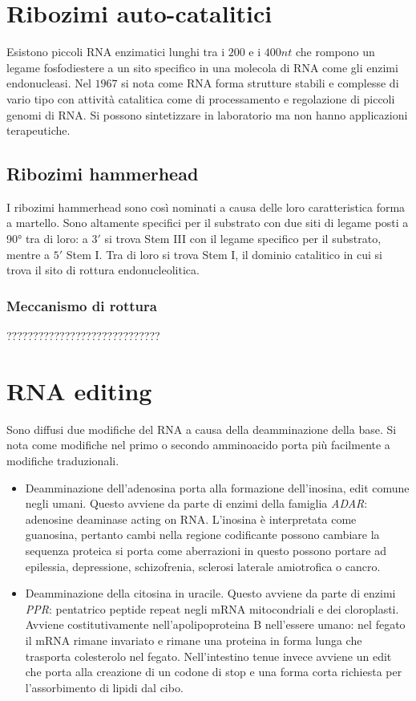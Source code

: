 \section{Ribozimi auto-catalitici}
Esistono piccoli RNA enzimatici lunghi tra i $200$ e i $400nt$ che rompono un legame fosfodiestere a un sito specifico in una molecola di RNA come gli enzimi endonucleasi. Nel $1967$
si nota come RNA forma strutture stabili e complesse di vario tipo con attivit\`a catalitica come di processamento e regolazione di piccoli genomi di RNA. Si possono sintetizzare in 
laboratorio ma non hanno applicazioni terapeutiche. 
\subsection{Ribozimi hammerhead}
I ribozimi hammerhead sono cos\`i nominati a causa delle loro caratteristica forma a martello. Sono altamente specifici per il substrato con due siti di legame posti a \ang{90} 
tra di loro: a $3'$ si trova Stem III con il legame specifico per il substrato, mentre a $5'$ Stem I. Tra di loro si trova Stem I, il dominio catalitico in cui si trova il sito di 
rottura endonucleolitica. 
\subsubsection{Meccanismo di rottura}
?????????????????????????????
\section{RNA editing}
Sono diffusi due modifiche del RNA a causa della deamminazione della base. Si nota come modifiche nel primo o secondo amminoacido porta pi\`u facilmente a modifiche traduzionali. 
\begin{itemize}
	\item Deamminazione dell'adenosina porta alla formazione dell'inosina, edit comune negli umani. Questo avviene da parte di enzimi della famiglia \emph{ADAR}: adenosine deaminase
		acting on RNA. L'inosina \`e interpretata come guanosina, pertanto cambi nella regione codificante possono cambiare la sequenza proteica si porta come aberrazioni in
		questo possono portare ad epilessia, depressione, schizofrenia, sclerosi laterale amiotrofica o cancro.
	\item Deamminazione della citosina in uracile. Questo avviene da parte di enzimi \emph{PPR}: pentatrico peptide repeat negli mRNA mitocondriali e dei cloroplasti. Avviene 
		costitutivamente nell'apolipoproteina B nell'essere umano: nel fegato il mRNA rimane invariato e rimane una proteina in forma lunga che trasporta colesterolo nel 
		fegato. Nell'intestino tenue invece avviene un edit che porta alla creazione di un codone di stop e una forma corta richiesta per l'assorbimento di lipidi dal cibo. 
\end{itemize}
